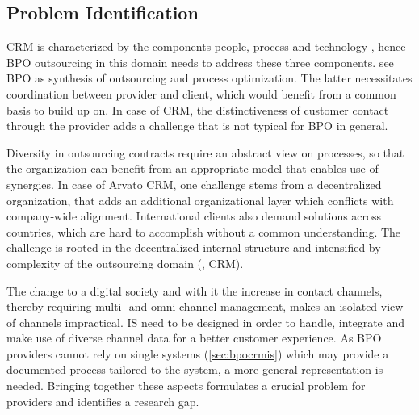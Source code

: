 \subsection{Problem Identification}
\label{sec:proide}
CRM is characterized by the components people, process and technology \citep{Chen_2003}, hence BPO outsourcing in this domain needs to address these three components. \cite{schewe2007} see BPO as synthesis of outsourcing and process optimization. The latter necessitates coordination between provider and client, which would benefit from a common basis to build up on. In case of CRM, the distinctiveness of customer contact through the provider adds a challenge that is not typical for BPO in general. 

Diversity in outsourcing contracts require an abstract view on processes, so that the organization can benefit from an appropriate model that enables use of synergies. In case of Arvato CRM, one challenge stems from a decentralized organization, that adds an additional organizational layer which conflicts with company-wide alignment. International clients also demand solutions across countries, which are hard to accomplish without a common understanding. The challenge is rooted in the decentralized internal structure and intensified by complexity of the outsourcing domain (\eg, \acrshort{CRM}).

The change to a digital society and with it the increase in contact channels, thereby requiring multi- and omni-channel management, makes an isolated view of channels impractical. \acrshort{IS} need to be designed in order to handle, integrate and make use of diverse channel data for a better customer experience. As BPO providers cannot rely on single systems (\cf \ref{sec:bpocrmis}) which may provide a documented process tailored to the system, a more general representation is needed. Bringing together these aspects formulates a crucial problem for providers and identifies a research gap. 


